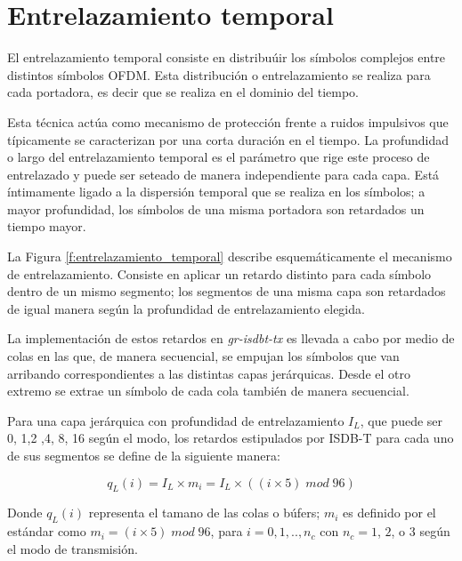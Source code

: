 \section{Entrelazamiento temporal}

El entrelazamiento temporal consiste en distribu\'uir los s\'imbolos complejos entre distintos s\'imbolos OFDM. Esta distribuci\'on o entrelazamiento se realiza para cada portadora, es decir que se realiza en el dominio del tiempo.

Esta t\'ecnica act\'ua como mecanismo de protecci\'on frente a ruidos impulsivos que t\'ipicamente se caracterizan por una corta duraci\'on en el tiempo. La profundidad o largo del entrelazamiento temporal es el par\'ametro que rige este proceso de entrelazado y puede ser seteado de manera independiente para cada capa. Est\'a \'intimamente ligado a la dispersi\'on temporal que se realiza en los s\'imbolos; a mayor profundidad, los s\'imbolos de una misma portadora son retardados un tiempo mayor.

La Figura \ref{f:entrelazamiento_temporal} describe esquem\'aticamente el mecanismo de entrelazamiento. Consiste en aplicar un retardo distinto para cada s\'imbolo dentro de un mismo segmento; los segmentos de una misma capa son retardados de igual manera seg\'un la profundidad de entrelazamiento elegida. 

La implementaci\'on de estos retardos en \textit{gr-isdbt-tx} es llevada a cabo por medio de colas en las que, de manera secuencial, se empujan los s\'imbolos que van arribando correspondientes a las distintas capas jer\'arquicas. Desde el otro extremo se extrae un s\'imbolo de cada cola tambi\'en de manera secuencial. 

Para una capa jer\'arquica con profundidad de entrelazamiento $I_L$, que puede ser 0, 1,2 ,4, 8, 16 seg\'un el modo, los retardos estipulados por ISDB-T para cada uno de sus segmentos se define de la siguiente manera:

\begin{equation}
q_L(i) = I_L \times m_i = I_L \times ((i \times 5) \; mod \; 96)
\end{equation}

Donde $q_L(i)$ representa el tamano de las colas o búfers; $m_i$ es definido por el est\'andar como $m_i = (i \times 5) \; mod \; 96$, para $i = 0, 1,..,n_c$ con $n_c = 1$, $2$, o $3$ seg\'un el modo de transmisi\'on. 

